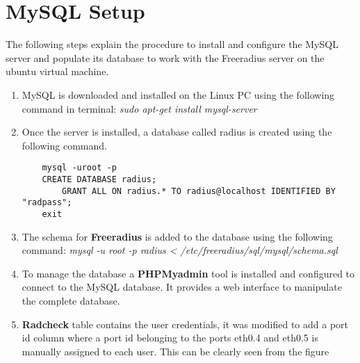 \section{MySQL Setup}
The following steps explain the procedure to install and configure the MySQL server and populate its database to work with the Freeradius server on the ubuntu virtual machine.
\begin{enumerate}
	\item MySQL is downloaded and installed on the Linux PC using the following command in terminal: \textit{sudo apt-get install mysql-server}
	\item Once the server is installed, a database called radius is created using the following command. 
	\begin{lstlisting}
	mysql -uroot -p
	CREATE DATABASE radius;
		GRANT ALL ON radius.* TO radius@localhost IDENTIFIED BY "radpass";
	exit
	\end{lstlisting}
	
	\item The schema for \textbf{Freeradius} is added to the database using the following command: \textit{mysql -u root -p radius < /etc/freeradius/sql/mysql/schema.sql}
	\item	To manage the database a\textbf{ PHPMyadmin} tool is installed and configured to connect to the MySQL database. It provides a web interface to manipulate the complete database.
	\item	\textbf{Radcheck} table contains the user credentials, it was modified to add a port id column where a port id belonging to the ports eth0.4 and eth0.5 is manually assigned to each user. This can be clearly seen from the figure 
	
\end{enumerate}
